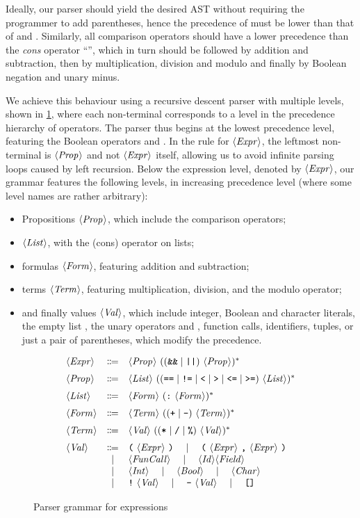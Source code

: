 Ideally, our parser should yield the desired AST without requiring the
programmer to add parentheses, hence the precedence of \code{\&\&} must be lower
than that of \code{==} and \code{!=}.
Similarly, all comparison operators should have a lower precedence than the
\emph{cons} operator ``\code{:}'', which in turn should be followed by addition
and subtraction, then by multiplication, division and modulo and finally by
Boolean negation and unary minus.

We achieve this behaviour using a recursive descent parser with multiple levels,
shown in \cref{fig:new-expr-grammar}, where each non-terminal corresponds to a
level in the precedence hierarchy of operators.
%
The parser thus begins at the lowest precedence level, featuring the Boolean
operators \code{\&\&} and \code{||}.
In the rule for $\langle \textit{Expr}\kern.7pt \rangle$, the leftmost non-terminal is $\langle \textit{Prop}\kern.7pt \rangle$ and not
$\langle \textit{Expr}\kern.7pt \rangle$ itself, allowing us to avoid infinite parsing loops caused by left
recursion.
%
Below the expression level, denoted by $\langle \textit{Expr}\kern.7pt \rangle$, our grammar
features the following levels, in increasing precedence level (where some level
names are rather arbitrary):
\begin{itemize}
  \item Propositions $\langle \textit{Prop}\kern.7pt \rangle$, which include the comparison operators;
  \item $\langle \textit{List}\kern.7pt \rangle$, with the \spl{:} (cons) operator on lists;
  \item formulas $\langle \textit{Form}\kern.7pt \rangle$, featuring addition and subtraction;
  \item terms $\langle \textit{Term}\kern.7pt \rangle$, featuring multiplication, division, and the modulo
        operator;
  \item and finally values $\langle \textit{Val}\kern.7pt \rangle$, which include integer, Boolean and
        character literals, the empty list \spl{[]}, the unary operators \spl{!}
        and \spl{-}, function calls, identifiers, tuples, or just a pair of
        parentheses, which modify the precedence.
\end{itemize}

\begin{figure}[th]
  \[
  \begin{array}{lcl}
		\NT{Expr} & \Coloneqq & \NT{Prop}\ ((\code{\&\&} \mid \code{||})\ \NT{Prop})^* \br
		\NT{Prop} & \Coloneqq & \NT{List}\ ((\code{==} \mid \code{!=} \mid \code{<} \mid \code{>} \mid \code{<=} \mid \code{>=})\ \NT{List})^* \br
		\NT{List} & \Coloneqq & \NT{Form}\ (\code{:}\ \NT{Form})^* \br
		\NT{Form} & \Coloneqq & \NT{Term}\ (( \code{+} \mid \code{-} )\ \NT{Term})^* \br
		\NT{Term} & \Coloneqq & \NT{Val}\ (( \code{*} \mid \code{/} \mid \code{\%} )\ \NT{Val} )^* \br
		\NT{Val} & \Coloneqq & \code{(}\ \NT{Expr}\ \code{)} \ruleSep
      \code{(}\ \NT{Expr}\ \code{,}\ \NT{Expr}\ \code{)} \\
		& \mid & \NT{FunCall} \ruleSep
      \NT{Id} \NT{Field} \\
    & \mid & \NT{Int} \ruleSep \NT{Bool} \ruleSep \NT{Char} \\
		& \mid & \code{!}\ \NT{Val} \ruleSep \code{-}\ \NT{Val} \ruleSep \code{[]}
  \end{array}
  \]
  \caption{Parser grammar for expressions}
  \label{fig:new-expr-grammar}
\end{figure}
%

